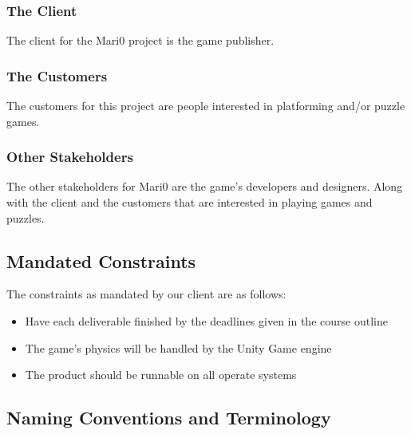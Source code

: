 \documentclass[12pt, titlepage]{article}
\begin{document}
\subsubsection{The Client}
The client for the Mari0 project is the game publisher.

\subsubsection{The Customers}
The customers for this project are people interested in platforming and/or puzzle games.

\subsubsection{Other Stakeholders}
The other stakeholders for Mari0 are the game's developers and designers. Along with the client and the customers that are interested in playing games and puzzles.

\subsection{Mandated Constraints}
The constraints as mandated by our client are as follows:
\begin{itemize}
	\item Have each deliverable finished by the deadlines given in the course outline
	\item The game's physics will be handled by the Unity Game engine
	\item The product should be runnable on all operate systems
\end{itemize}

\subsection{Naming Conventions and Terminology}
\end{document}
